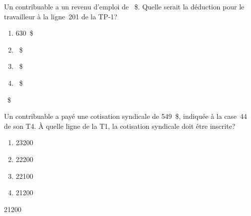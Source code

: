 \begin{question}
	Un contribuable a un revenu d'emploi de ~\$. Quelle serait la déduction pour le travailleur à la ligne~201 de la TP-1?
	\begin{enumerate}[label=\Alph*.]
		\item 630~\$
		\item {}~\$
		\item {}~\$
		\item {}~\$
	\end{enumerate}
\end{question}
~\$

\begin{question}
	Un contribuable a payé une cotisation syndicale de 549~\$, indiquée à la case~44 de son T4. À quelle ligne de la T1, la cotisation syndicale doit être inscrite?
	\begin{enumerate}[label=\Alph*.]
		\item 23200
		\item 22200
		\item 22100
		\item 21200
	\end{enumerate}
\end{question}
21200
